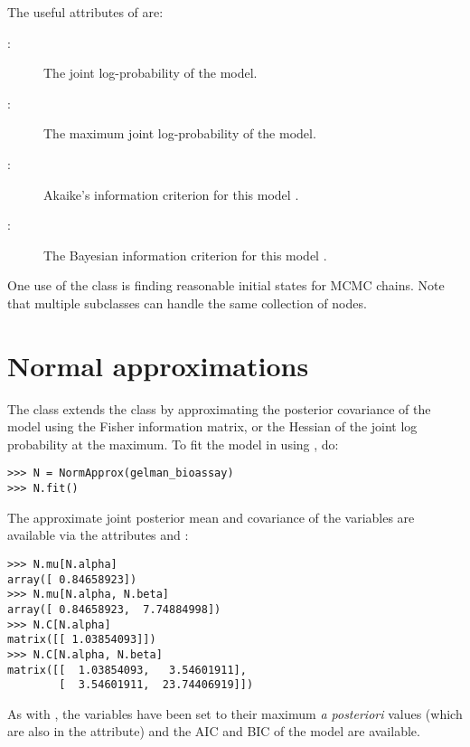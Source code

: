 The useful attributes of  are:
\begin{description}
    \item[:] The joint log-probability of the model.
    \item[:] The maximum joint log-probability of the model.
    \item[:] Akaike's information criterion for this model \citep{Akaike:1973aj,Burnham:2002ic}.
    \item[:] The Bayesian information criterion for this model \citep{Schwarz:1978ud}.
\end{description}

One use of the  class is finding reasonable initial states for MCMC chains. Note that multiple  subclasses can handle the same collection of nodes.

\hypertarget{norm-approx}{}
\section{Normal approximations} \label{sec:norm-approx}

The  class extends the  class by approximating the posterior covariance of the model using the Fisher information matrix, or the Hessian of the joint log probability at the maximum. To fit the model in  using , do:
\begin{verbatim}
>>> N = NormApprox(gelman_bioassay)
>>> N.fit()
\end{verbatim}
The approximate joint posterior mean and covariance of the variables are available via the attributes  and :
\begin{verbatim}
>>> N.mu[N.alpha]
array([ 0.84658923])
>>> N.mu[N.alpha, N.beta]
array([ 0.84658923,  7.74884998])
>>> N.C[N.alpha]
matrix([[ 1.03854093]])
>>> N.C[N.alpha, N.beta]
matrix([[  1.03854093,   3.54601911],
        [  3.54601911,  23.74406919]])
\end{verbatim}
As with , the variables have been set to their maximum \emph{a posteriori} values (which are also in the  attribute) and the AIC and BIC of the model are available.

